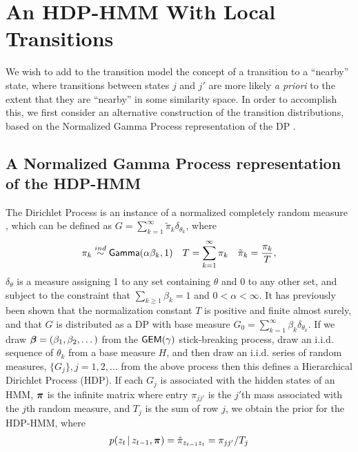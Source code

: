 \section{An HDP-HMM With Local Transitions}
\label{sec:model}
We wish to add to the transition model the concept of a transition to
a ``nearby'' state, where transitions between states $j$ and $j'$ are
more likely {\em a priori} to the extent that they are ``nearby'' in
some similarity space.  In order to accomplish this, we first
consider an alternative construction of the transition distributions,
based on the Normalized Gamma Process representation of the DP
\cite{ishwaran2002exact, ferguson1973bayesian}.


\subsection{A Normalized Gamma Process representation of the HDP-HMM}
\label{sec:normalized-gamma}

The Dirichlet Process is an instance of a normalized completely random measure
\cite{kingman1967completely, ferguson1973bayesian},
which can be defined as $G = \sum_{k=1}^{\infty} \tilde{\pi}_k \delta_{\theta_k}$, where 
\begin{align}
  \pi_{k} \stackrel{ind}{\sim} \mathsf{Gamma}(\alpha \beta_{k},1) \quad T =
  \sum_{k=1}^{\infty} \pi_{k} \quad
  \tilde{\pi}_{k} = \frac{\pi_{k}}{T} \label{eq:20},
\end{align}
$\delta_{\theta}$ is a measure assigning 1 to any set containing $\theta$ and
0 to any other set, and subject to the constraint 
that $\sum_{k\geq 1} \beta_{k} = 1$ and $0 < \alpha < \infty$.  It
has previously been shown \cite{ferguson1973bayesian, paisley2012discrete, favaro2013mcmc}
that the normalization constant $T$ is positive and finite almost
surely, and that $G$ is distributed as a DP
with base measure $G_0 = \sum_{k=1}^{\infty} \beta_{k} \delta_{\theta_{k}}$.
If we draw $\boldsymbol{\beta} = (\beta_1, \beta_2, \dots)$ from the
$\mathsf{GEM}(\gamma)$ stick-breaking process, draw an
i.i.d. sequence of $\theta_k$ from a base measure $H$, and then draw an i.i.d.
series of random measures, $\{G_j\}, j = 1, 2, \dots$ from the above process
then this defines a Hierarchical Dirichlet Process (HDP).  If each $G_j$
is associated with the hidden states of an HMM, $\boldsymbol{\pi}$ is the infinite
matrix where entry $\pi_{jj'}$ is
the $j'$th mass associated with the $j$th random measure, and
$T_j$ is the sum of row $j$, we obtain the prior for the HDP-HMM, where
\begin{align}
  \label{eq:50}
  p(z_t \, \vert \, z_{t-1}, \boldsymbol{\pi}) = \tilde{\pi}_{z_{t-1}z_t} = \pi_{jj'} / T_j
\end{align}

